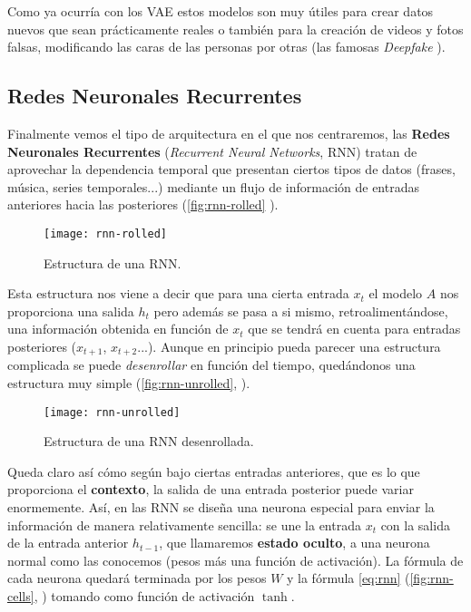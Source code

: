 Como ya ocurría con los VAE estos modelos son muy útiles para crear datos nuevos que sean prácticamente reales o también para la creación de videos y fotos falsas, modificando las caras de las personas por otras (las famosas \emph{Deepfake} \cite{nguyen2020deepfake}).

\subsection{Redes Neuronales Recurrentes}

Finalmente vemos el tipo de arquitectura en el que nos centraremos, las \textbf{Redes Neuronales Recurrentes} (\emph{Recurrent Neural Networks}, RNN) \cite{elman1990finding} tratan de aprovechar la dependencia temporal que presentan ciertos tipos de datos (frases, música, series temporales...) mediante un flujo de información de entradas anteriores hacia las posteriores (\autoref{fig:rnn-rolled} \cite{christopher2015lstm}).

\begin{figure}[htpb]
  \centering
  \texttt{[image: rnn-rolled]}
  \caption{Estructura de una RNN.}
  \label{fig:rnn-rolled}
\end{figure}

Esta estructura nos viene a decir que para una cierta entrada $x_t$ el modelo $A$ nos proporciona una salida $h_t$ pero además se pasa a si mismo, retroalimentándose, una información obtenida en función de $x_t$ que se tendrá en cuenta para entradas posteriores ($x_{t + 1}$, $x_{t + 2}$...). Aunque en principio pueda parecer una estructura complicada se puede \emph{desenrollar} en función del tiempo, quedándonos una estructura muy simple (\autoref{fig:rnn-unrolled}, \cite{christopher2015lstm}).

\begin{figure}[htpb]
  \centering
  \texttt{[image: rnn-unrolled]}
  \caption{Estructura de una RNN desenrollada.}
  \label{fig:rnn-unrolled}
\end{figure}

Queda claro así cómo según bajo ciertas entradas anteriores, que es lo que proporciona el \textbf{contexto}, la salida de una entrada posterior puede variar enormemente. Así, en las RNN se diseña una neurona especial para enviar la información de manera relativamente sencilla: se une la entrada $x_t$ con la salida de la entrada anterior $h_{t-1}$, que llamaremos \textbf{estado oculto}, a una neurona normal como las conocemos (pesos más una función de activación). La fórmula de cada neurona quedará terminada por los pesos $W$ y la fórmula \eqref{eq:rnn} (\autoref{fig:rnn-cells}, \cite{christopher2015lstm}) tomando como función de activación $\tanh$.

